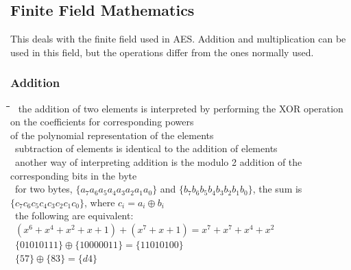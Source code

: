 \documentclass[10pt,letterpaper]{scrartcl}
\newcommand{\tbul}{\textbullet}
\newcommand{\tend}{\>\textendash}
\newcommand{\tasc}{\>\>\textasteriskcentered}
\newcommand{\tabDef}{\hspace{2em}\=\hspace{2em}\=\hspace{2em}\=\hspace{2em}\=\kill}
\begin{document}
\subsection{Finite Field Mathematics}
This deals with the finite field used in AES. Addition and multiplication can be used in this field, but the operations differ from the ones normally used. 
\subsubsection*{Addition}\begin{tabbing}\tabDef
\tbul\ the addition of two elements is interpreted by performing the XOR operation on the coefficients for corresponding powers \\ of the polynomial representation of the elements \\
\tbul\ subtraction of elements is identical to the addition of elements \\
\tbul\ another way of interpreting addition is the modulo 2 addition of the corresponding bits in the byte \\
    \tend\ for two bytes, $\{a_7a_6a_5a_4a_3a_2a_1a_0\}$ and $\{b_7b_6b_5b_4b_3b_2b_1b_0\}$, the sum is $\{c_7c_6c_5c_4c_3c_2c_1c_0\}$, where $c_i = a_i \oplus b_i$ \\
    \tend\ the following are equivalent: \\
        \tasc\ $(x^6+x^4+x^2+x+1)+(x^7+x+1)=x^7+x^7+x^4+x^2$\\
        \tasc\ $\{01010111\}\oplus \{10000011\}=\{11010100\}$ \\
        \tasc\ $\{57\}\oplus \{83\}=\{d4\}$\end{tabbing}
\end{document}
